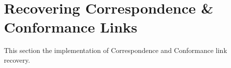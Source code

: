 \section{Recovering Correspondence \& Conformance Links}
\label{section:RecoveringCorrespondenceAndConformanceLinks}
This section the implementation of \gls{Correspondence} and \gls{Conformance} link recovery.

